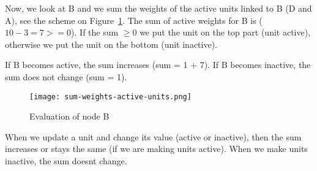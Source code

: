 \documentclass[main]{subfiles}
\begin{document}
Now, we look at B and we sum the weights of the active units linked to B (D and A), see the scheme on Figure~\ref{fig:sum-weights}. The sum of active weights for B is ($10 - 3 = 7 >= 0$). If the sum $\geq 0$ we put the unit on the top part (unit active), otherwise we put the unit on the bottom (unit inactive).

If B becomes active, the sum increases (sum = 1 + 7). If B becomes inactive, the sum does not change (sum = 1).

\begin{figure}[H]
	\centering
	\texttt{[image: sum-weights-active-units.png]}
	\label{fig:sum-weights}
	\caption{Evaluation of node B}
\end{figure}

When we update a unit and change its value (active or inactive), then the sum increases or stays the same (if we are making units active). When we make units inactive, the sum doesnt change.
\end{document}
